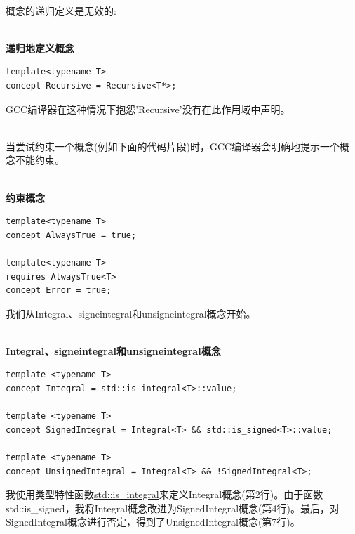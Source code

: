 \hspace*{\fill} \\ %
\begin{tcolorbox}[breakable,enhanced jigsaw,colback=red!5!white,colframe=red!75!black,title={不要递归地定义概念或尝试约束它们}]
	
概念的递归定义是无效的:
	
\hspace*{\fill} \\ %
\noindent
\textbf{递归地定义概念}
\begin{lstlisting}[style=styleCXX]
template<typename T>
concept Recursive = Recursive<T*>;
\end{lstlisting}
	
GCC编译器在这种情况下抱怨'Recursive'没有在此作用域中声明。

\hspace*{\fill} \\ %
当尝试约束一个概念(例如下面的代码片段)时，GCC编译器会明确地提示一个概念不能约束。
	
\hspace*{\fill} \\ %
\noindent
\textbf{约束概念}
\begin{lstlisting}[style=styleCXX]
template<typename T>
concept AlwaysTrue = true;

template<typename T>
requires AlwaysTrue<T>
concept Error = true;
\end{lstlisting}

\end{tcolorbox}

我们从Integral、signeintegral和unsigneintegral概念开始。

\hspace*{\fill} \\ %
\noindent
\textbf{Integral、signeintegral和unsigneintegral概念}
\begin{lstlisting}[style=styleCXX]
template <typename T>
concept Integral = std::is_integral<T>::value;

template <typename T>
concept SignedIntegral = Integral<T> && std::is_signed<T>::value;

template <typename T>
concept UnsignedIntegral = Integral<T> && !SignedIntegral<T>;
\end{lstlisting}

我使用类型特性函数\href{https://en.cppreference.com/w/cpp/types/is_integral}{std::is\_integral}来定义Integral概念(第2行)。由于函数std::is\_signed，我将Integral概念改进为SignedIntegral概念(第4行)。最后，对SignedIntegral概念进行否定，得到了UnsignedIntegral概念(第7行)。

